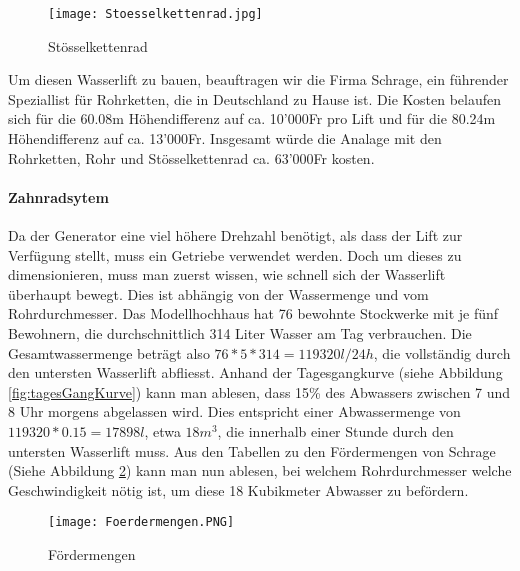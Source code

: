 \begin{figure} [H]
	\centering
	\texttt{[image: Stoesselkettenrad.jpg]}
	\caption{Stösselkettenrad \cite{schrage}}
	\label{fig:stoesselkettenrad}
\end{figure}


Um diesen Wasserlift zu bauen, beauftragen wir die Firma Schrage, ein führender Speziallist für Rohrketten, die in Deutschland zu Hause ist. Die Kosten belaufen sich für die 60.08\si{m} Höhendifferenz auf ca. 10'000\si{Fr} pro Lift und für die 80.24\si{m} Höhendifferenz auf ca. 13'000\si{Fr}. Insgesamt würde die Analage mit den Rohrketten, Rohr und Stösselkettenrad ca. 63'000\si{Fr} kosten. \cite{schrage}

\newpage

\paragraph{Zahnradsytem}
Da der Generator eine viel höhere Drehzahl benötigt, als dass der Lift zur Verfügung stellt, muss ein Getriebe verwendet werden. Doch um dieses zu dimensionieren, muss man zuerst wissen, wie schnell sich der Wasserlift überhaupt bewegt. Dies ist abhängig von der Wassermenge und vom Rohrdurchmesser. Das Modellhochhaus hat 76 bewohnte Stockwerke mit je fünf Bewohnern, die durchschnittlich 314 Liter Wasser am Tag verbrauchen. Die Gesamtwassermenge beträgt also \(76 * 5 * 314 = 119320 l/24h\), die vollständig durch den untersten Wasserlift abfliesst. Anhand der Tagesgangkurve (siehe Abbildung \ref{fig:tagesGangKurve}) kann man ablesen, dass 15\% des Abwassers zwischen 7 und 8 Uhr morgens abgelassen wird. Dies entspricht einer Abwassermenge von \(119320 * 0.15 = 17898 l\), etwa \(18 m^3 \), die innerhalb einer Stunde durch den untersten Wasserlift muss. Aus den Tabellen zu den Fördermengen von Schrage (Siehe Abbildung \ref{fig:foerdermengen}) kann man nun ablesen, bei welchem Rohrdurchmesser welche Geschwindigkeit nötig ist, um diese 18 Kubikmeter Abwasser zu befördern. 

\begin{figure} [H]
	\centering
	\texttt{[image: Foerdermengen.PNG]}
	\caption{Fördermengen \cite{schrage}}
	\label{fig:foerdermengen}
\end{figure}

